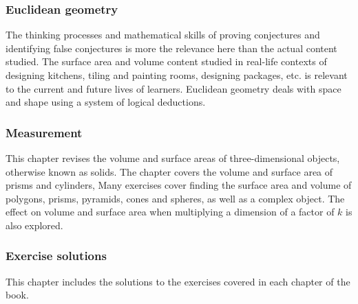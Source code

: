 \subsubsection{Euclidean geometry }
The thinking processes and mathematical skills of proving conjectures and identifying false conjectures is more the relevance here than the actual content studied. The surface area and volume content studied in real-life contexts of designing kitchens, tiling and painting rooms, designing packages, etc. is relevant to the current and future lives of learners. Euclidean geometry deals with space and shape using a system of logical deductions.
\subsubsection{Measurement}
This chapter revises the volume and surface areas of three-dimensional objects, otherwise known as solids. The chapter covers the volume and surface area of prisms and cylinders, Many exercises cover finding the surface area and volume of polygons, prisms, pyramids, cones and spheres, as well as a complex object. The effect on volume and surface area when multiplying a dimension of a factor of $k$ is also explored.
\subsubsection{Exercise solutions}
This chapter includes the solutions to the exercises covered in each chapter of the book.